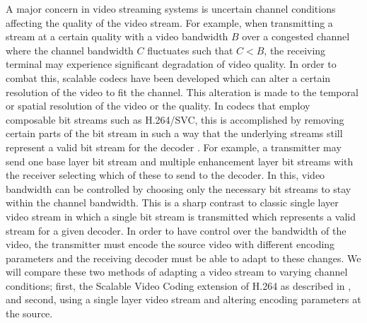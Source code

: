 \documentclass[3p,times,procedia]{elsarticle}
\begin{document}
A major concern in video streaming systems is uncertain channel conditions affecting the quality of the video stream. For example, when transmitting a stream at a certain quality with a video bandwidth $B$ over a congested channel where the channel bandwidth $C$ fluctuates such that $C < B$, the receiving terminal may experience significant degradation of video quality. In order to combat this, scalable codecs have been developed which can alter a certain resolution of the video to fit the channel. This alteration is made to the temporal or spatial resolution of the video or the quality. In codecs that employ composable bit streams such as H.264/SVC, this is accomplished by removing certain parts of the bit stream in such a way that the underlying streams still represent a valid bit stream for the decoder \cite{SVCOverview}. For example, a transmitter may send one base layer bit stream and multiple enhancement layer bit streams with the receiver selecting which of these to send to the decoder. In this, video bandwidth can be controlled by choosing only the necessary bit streams to stay within the channel bandwidth. This is a sharp contrast to classic single layer video stream in which a single bit stream is transmitted which represents a valid stream for a given decoder. In order to have control over the bandwidth of the video, the transmitter must encode the source video with different encoding parameters and the receiving decoder must be able to adapt to these changes. We will compare these two methods of adapting a video stream to varying channel conditions; first, the Scalable Video Coding extension of H.264 as described in \cite{SVCOverview}, and second, using a single layer video stream and altering encoding parameters at the source. 
\end{document}
